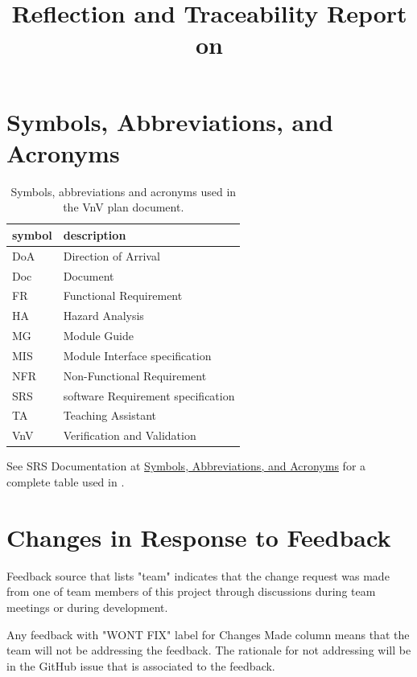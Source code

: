 \documentclass{article}
\title{Reflection and Traceability Report on \progname}
\author{\authname}
\date{}
\begin{document}
\maketitle

\newpage

\newpage

\section{Symbols, Abbreviations, and Acronyms}

\renewcommand{\arraystretch}{1.2}
\begin{table}[H]
  \centering
  \begin{tabular}{|l|l|} 
    \hline	
    \textbf{symbol} & \textbf{description}\\
    \hline
    DoA & Direction of Arrival \\
    Doc & Document \\
    FR & Functional Requirement \\
    HA & Hazard Analysis \\
    MG & Module Guide \\
    MIS & Module Interface specification \\
    NFR & Non-Functional Requirement \\
    SRS & software Requirement specification \\
    TA & Teaching Assistant \\
    VnV & Verification and Validation \\
    \hline
  \end{tabular}
  \caption{Symbols, abbreviations and acronyms used in the VnV plan document.}
\end{table}

See SRS Documentation at
\hyperref[SRS-sec:symbols]{Symbols, Abbreviations, and Acronyms}
for a complete table used in \progname.

\newpage
\tableofcontents
\listoftables
\listoffigures
\newpage

\section{Changes in Response to Feedback}

Feedback source that lists "team" indicates that the change request was made
from one of team members of this project through discussions during team
meetings or during development.

Any feedback with "WONT FIX" label for Changes Made column means that the team
will not be addressing the feedback. The rationale for not addressing will
be in the GitHub issue that is associated to the feedback.
\end{document}
